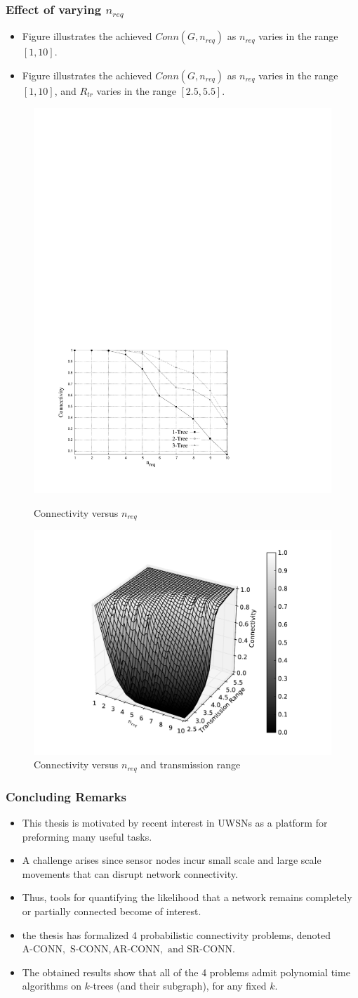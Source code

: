 \documentclass{beamer}
\newcommand{\ACONN}   { {\mathrm {A\mbox{-}CONN}} }
\newcommand{\SCONN}   { {\mathrm {S\mbox{-}CONN}} }
\newcommand{\ARCONN}   { {\mathrm {AR\mbox{-}CONN}} }
\newcommand{\SRCONN}   { {\mathrm {SR\mbox{-}CONN}} }
\begin{document}
\begin{frame}
\frametitle{Effect of varying $n_{req}$} 
\begin{itemize}
\item Figure illustrates the achieved $Conn(G,n_{req})$ as $n_{req}$ varies in the range $[1,10]$.
\item Figure illustrates the achieved $Conn(G,n_{req})$ as $n_{req}$ varies in the range $[1,10]$, and $R_{tr}$ varies in the range $[2.5,5.5]$.

\end{itemize}
\begin{figure}[!htb]
\begin{minipage}{0.5\linewidth}
\centering
\includegraphics[width=2 in, height=1.5 in]{abc.pdf}
\caption{Connectivity versus $n_{req}$}
\label{Fig:CvCwr1}
\end{minipage}
\begin{minipage}{0.45\linewidth}
\centering
\includegraphics[width=2 in, height=1.5 in]{3D.pdf}
\caption{Connectivity versus $n_{req}$ and transmission range}
\label{Fig:CvCwr2}
\end{minipage}
\end{figure}

\end{frame}
\begin{frame}
\frametitle{Concluding Remarks}
\begin{itemize}
\item This thesis is motivated by recent interest in UWSNs as a platform for preforming many useful tasks. 
\item A challenge arises since sensor nodes incur small scale and large scale movements that can disrupt network connectivity.
\item  Thus, tools for quantifying the likelihood that a network remains completely or partially connected become of interest.

\item the thesis has formalized 4 probabilistic connectivity problems, denoted $\ACONN,$ $ \SCONN, \ARCONN, \mbox{ and } \SRCONN$. 
\item The obtained results show that all of the 4 problems admit polynomial time algorithms on $k$-trees (and their subgraph), for any fixed $k$.
\end{itemize}
\end{frame}
\end{document}
